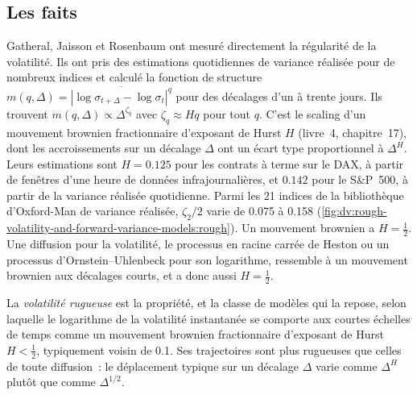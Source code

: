 \subsection{Les faits}

Gatheral, Jaisson et Rosenbaum ont mesuré directement la régularité de la volatilité. Ils ont pris des estimations
quotidiennes de variance réalisée pour de nombreux indices et calculé la fonction de structure
$m(q,\Delta)=\overline{|\log\sigma_{t+\Delta}-\log\sigma_t|^q}$ pour des décalages d'un à trente jours. Ils trouvent
$m(q,\Delta)\propto\Delta^{\zeta_q}$ avec $\zeta_q\approx Hq$ pour tout $q$. C'est le scaling d'un
mouvement brownien fractionnaire d'exposant de Hurst $H$ (livre~4, chapitre~17), dont les accroissements sur un
décalage $\Delta$ ont un écart type proportionnel à $\Delta^H$. Leurs estimations sont $H=0.125$ pour les contrats à terme sur le DAX, à partir de fenêtres d'une heure de données infrajournalières, et $0.142$ pour le
S\&P~500, à partir de la variance réalisée quotidienne. Parmi les 21 indices de la bibliothèque d'Oxford-Man
de variance réalisée, $\zeta_2/2$ varie de 0.075 à 0.158 (\cref{fig:dv:rough-volatility-and-forward-variance-models:rough}).
Un mouvement brownien a $H=\frac12$. Une diffusion pour la volatilité, le processus en racine carrée de Heston ou un
processus d'Ornstein--Uhlenbeck pour son logarithme, ressemble à un mouvement brownien aux décalages courts, et a donc
aussi $H=\frac12$.

\begin{definition}\label{def:dv:rough-volatility-and-forward-variance-models:rough}
La \emph{volatilité rugueuse} est la propriété, et la classe de modèles qui la repose, selon laquelle le
logarithme de la volatilité instantanée se comporte aux courtes échelles de temps comme un mouvement brownien fractionnaire
d'exposant de Hurst $H<\frac12$, typiquement voisin de 0.1. Ses trajectoires sont plus rugueuses que celles de toute diffusion~: le
déplacement typique sur un décalage $\Delta$ varie comme $\Delta^H$ plutôt que comme $\Delta^{1/2}$.
\end{definition}

